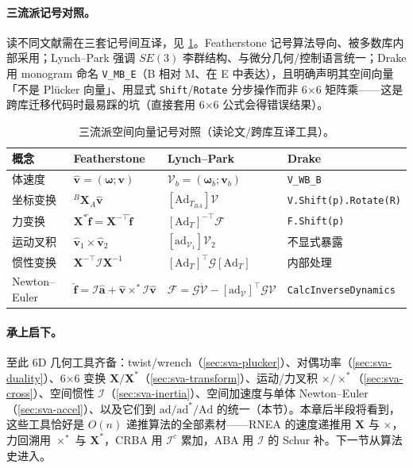 \paragraph{三流派记号对照。}
读不同文献需在三套记号间互译，见 \cref{tab:sva-notations}。Featherstone 记号算法导向、被多数库内部采用；Lynch--Park\cite{lynch2017modern,murray1994mathematical} 强调 $SE(3)$ 李群结构、与微分几何/控制语言统一；Drake 用 monogram 命名 \texttt{V\_MB\_E}（B 相对 M、在 E 中表达），且明确声明其空间向量「不是 Plücker 向量」、用显式 \texttt{Shift}/\allowbreak\texttt{Rotate} 分步操作而非 6×6 矩阵乘——这是跨库迁移代码时最易踩的坑（直接套用 6×6 公式会得错误结果）。

\begin{table}[H]\centering\small
\caption{三流派空间向量记号对照（读论文/跨库互译工具）。}
\label{tab:sva-notations}
\begin{tabular}{llll}
\toprule
概念 & Featherstone & Lynch--Park & Drake \\
\midrule
体速度 & $\hat{\mathbf v}=(\boldsymbol\omega;\mathbf v)$ & $\mathcal V_b=(\boldsymbol\omega_b;\mathbf v_b)$ & \texttt{V\_WB\_B} \\
坐标变换 & ${}^B\mathbf X_A\hat{\mathbf v}$ & $[\mathrm{Ad}_{T_{BA}}]\mathcal V$ & \texttt{V.\allowbreak Shift(p).\allowbreak Rotate(R)} \\
力变换 & $\mathbf X^*\hat{\mathbf f}=\mathbf X^{-\top}\hat{\mathbf f}$ & $[\mathrm{Ad}_T]^{-\top}\mathcal F$ & \texttt{F.Shift(p)} \\
运动叉积 & $\hat{\mathbf v}_1\times\hat{\mathbf v}_2$ & $[\mathrm{ad}_{\mathcal V_1}]\mathcal V_2$ & 不显式暴露 \\
惯性变换 & $\mathbf X^{-\top}\mathcal I\mathbf X^{-1}$ & $[\mathrm{Ad}_T]^\top\mathcal G[\mathrm{Ad}_T]$ & 内部处理 \\
Newton--Euler & $\hat{\mathbf f}=\mathcal I\hat{\mathbf a}+\hat{\mathbf v}\times^*\mathcal I\hat{\mathbf v}$ & $\mathcal F=\mathcal G\dot{\mathcal V}-[\mathrm{ad}_{\mathcal V}]^\top\mathcal G\mathcal V$ & \texttt{CalcInverseDynamics} \\
\bottomrule
\end{tabular}
\end{table}

\paragraph{承上启下。}
至此 6D 几何工具齐备：twist/wrench（\cref{sec:sva-plucker}）、对偶功率（\cref{sec:sva-duality}）、6×6 变换 $\mathbf X/\mathbf X^*$（\cref{sec:sva-transform}）、运动/力叉积 $\times/\times^*$（\cref{sec:sva-cross}）、空间惯性 $\mathcal I$（\cref{sec:sva-inertia}）、空间加速度与单体 Newton--Euler（\cref{sec:sva-accel}）、以及它们到 $\mathrm{ad}/\mathrm{ad}^*/\mathrm{Ad}$ 的统一（本节）。本章后半段将看到，这些工具恰好是 $O(n)$ 递推算法的全部素材——RNEA 的速度递推用 $\mathbf X$ 与 $\times$，力回溯用 $\times^*$ 与 $\mathbf X^*$，CRBA 用 $\mathcal I^c$ 累加，ABA 用 $\mathcal I$ 的 Schur 补。下一节从算法史进入。

